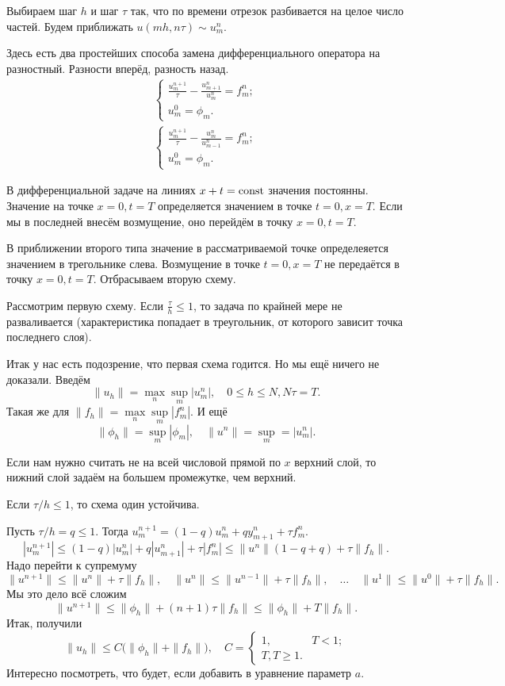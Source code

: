 Выбираем шаг $h$ и шаг $\tau$ так, что по времени отрезок разбивается на целое число частей. Будем приближать $u(mh,n\tau) \sim u_m^n$.

Здесь есть два простейших способа замена дифференциального оператора на разностный. Разности вперёд, разность назад.
\begin{gather}
\begin{cases}
\frac{u_m^{n+1}}{\tau} - \frac{u_{m+1}^n}{u_m^n} = f_m^n;\\
u_m^0 = \phi_m.
\end{cases}\\
\begin{cases}
\frac{u_m^{n+1}}{\tau} - \frac{u_{m}^n}{u_{m-1}^n} = f_m^n;\\
u_m^0 = \phi_m.
\end{cases}
\end{gather}

В дифференциальной задаче на линиях $x+t=\operatorname{const}$ значения постоянны. Значение на точке $x=0,t=T$ определяется значением в точке $t=0,x=T$. Если мы в последней внесём возмущение, оно перейдём в точку $x=0,t=T$.

В приближении второго типа значение в рассматриваемой точке определеяется значением в трегольнике слева. Возмущение в точке $t=0,x=T$ не передаётся в точку $x=0,t=T$. Отбрасываем вторую схему. 

Рассмотрим первую схему. Если $\frac\tau h\le 1$, то задача по крайней мере не разваливается (характеристика попадает в треугольник, от которого зависит точка последнего слоя).

Итак у нас есть подозрение, что первая схема годится. Но мы ещё ничего не доказали. Введём
\[
  \|u_h\| = \max\limits_n\sup\limits_m|u_m^n|,\quad 0\le h\le N, N\tau = T.
\]
Такая же для $\|f_h\| = \max\limits_n\sup\limits_m|f_m^n|$. И ещё
\[
  \|\phi_h\| = \sup\limits_m|\phi_m|,\quad \|u^n\| = \sup\limits_m = |u_m^n|.
\]

Если нам нужно считать не на всей числовой прямой по $x$ верхний слой, то нижний слой задаём на большем промежутке, чем верхний.

\begin{The}
Если $\tau/h\le 1$, то схема один устойчива.
\end{The}
\begin{Proof}
 Пусть $\tau/h = q\le 1$. Тогда $u_m^{n+1} = (1-q) u_m^n  + q y_{m+1}^n + \tau f_m^n$.
\[
  |u_m^{n+1}|\le (1-q)|u_m^n| + q |u_{m+1}^n| + \tau |f_m^n| \le \|u^n\| (1 - q + q) +\tau \|f_h\|.
\]
Надо перейти к супремуму
\[
  \|u^{n+1}\|\le \|u^n\| + \tau\|f_h\|,\quad 
  \|u^{n}\|\le \|u^{n-1}\| + \tau\|f_h\|,\quad\dots\quad  
  \|u^{1}\|\le \|u^0\| + \tau\|f_h\|.
\]
Мы это дело всё сложим
\[
  \|u^{n+1}\|\le \|\phi_h\| + (n+1)\tau\|f_h\| \le \|\phi_h\| + T \|f_h\|.
\]
 Итак, получили
\[
  \|u_h\|\le C\big(\|\phi_h\| + \|f_h\|\big),\quad C = \begin{cases}
1,& T<1;\\ T, T\ge 1.
\end{cases}
\]
Интересно посмотреть, что будет, если добавить в уравнение параметр $a$.
\end{Proof}

